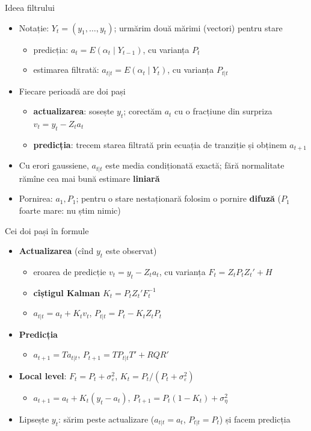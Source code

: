 \begin{frame}{Ideea filtrului}
\itemsize{\small}
\begin{itemize}
    \item Notație: $Y_t = (y_1, \dots, y_t)$; urmărim două mărimi (vectori) pentru stare
    \begin{itemize}
        \item predicția: $a_t = E(\alpha_t \mid Y_{t-1})$, cu varianța $P_t$
        \item estimarea filtrată: $a_{t|t} = E(\alpha_t \mid Y_t)$, cu varianța $P_{t|t}$
    \end{itemize}
    \item Fiecare perioadă are doi pași
    \begin{itemize}
        \item \textbf{actualizarea}: sosește $y_t$; corectăm $a_t$ cu o fracțiune din surpriza $v_t = y_t - Z_ta_t$
        \item \textbf{predicția}: trecem starea filtrată prin ecuația de tranziție și obținem $a_{t+1}$
    \end{itemize}
    \item Cu erori gaussiene, $a_{t|t}$ este media condiționată exactă; fără normalitate rămîne cea mai bună estimare \textbf{liniară} 
    \item Pornirea: $a_1, P_1$; pentru o stare nestaționară folosim o pornire \textbf{difuză} ($P_1$ foarte mare: nu știm nimic)
\end{itemize}
\end{frame}

\begin{frame}{Cei doi pași în formule}
\itemsize{\small}
\begin{itemize}
    \item \textbf{Actualizarea} (cînd $y_t$ este observat)
    \begin{itemize}
        \item eroarea de predicție $v_t = y_t - Z_ta_t$, cu varianța $F_t = Z_tP_tZ_t' + H$
        \item \textbf{cîștigul Kalman} $K_t = P_tZ_t'F_t^{-1}$
        \item $a_{t|t} = a_t + K_tv_t$, \quad $P_{t|t} = P_t - K_tZ_tP_t$
    \end{itemize}
    \item \textbf{Predicția}
    \begin{itemize}
        \item $a_{t+1} = Ta_{t|t}$, \quad $P_{t+1} = TP_{t|t}T' + RQR'$
    \end{itemize}
    \item \textbf{Local level}: $F_t = P_t + \sigma^2_\varepsilon$, \quad $K_t = P_t/(P_t + \sigma^2_\varepsilon)$
    \begin{itemize}
        \item $a_{t+1} = a_t + K_t(y_t - a_t)$, \quad $P_{t+1} = P_t(1 - K_t) + \sigma^2_\eta$
    \end{itemize}
    \item Lipsește $y_t$: sărim peste actualizare ($a_{t|t} = a_t$, $P_{t|t} = P_t$) și facem predicția
\end{itemize}
\end{frame}

